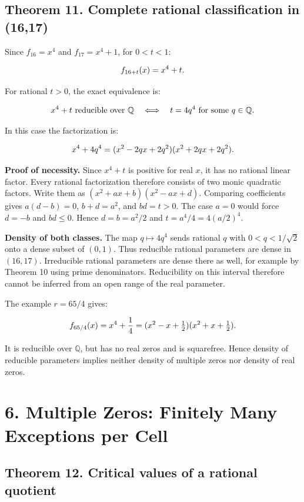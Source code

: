 \documentclass[11pt,a4paper]{article}
\newcommand{\fitmath}[1]{\begingroup\setbox0=\hbox{$\displaystyle #1$}\ifdim\wd0>\linewidth\resizebox{\linewidth}{!}{\box0}\else\box0\fi\endgroup}
\begin{document}
\subsection*{Theorem 11. Complete rational classification in (16,17)}

Since $f_{16}=x^4$ and $f_{17}=x^4+1$, for $0<t<1$:


\[
\fitmath{f_{16+t}(x)=x^4+t.}
\]


For rational $t>0$, the exact equivalence is:


\[
\fitmath{x^4+t\text{ reducible over }\mathbb Q\quad\Longleftrightarrow\quad t=4q^4\text{ for some }q\in\mathbb Q.}
\]


In this case the factorization is:


\[
\fitmath{x^4+4q^4=(x^2-2qx+2q^2)(x^2+2qx+2q^2).}
\]


\textbf{Proof of necessity.} Since $x^4+t$ is positive for real $x$, it has no rational linear factor. Every rational factorization therefore consists of two monic quadratic factors. Write them as $(x^2+ax+b)(x^2-ax+d)$. Comparing coefficients gives $a(d-b)=0$, $b+d=a^2$, and $bd=t>0$. The case $a=0$ would force $d=-b$ and $bd\leq0$. Hence $d=b=a^2/2$ and $t=a^4/4=4(a/2)^4$.


\textbf{Density of both classes.} The map $q\mapsto4q^4$ sends rational $q$ with $0<q<1/\sqrt2$ onto a dense subset of $(0,1)$. Thus reducible rational parameters are dense in $(16,17)$. Irreducible rational parameters are dense there as well, for example by Theorem 10 using prime denominators. Reducibility on this interval therefore cannot be inferred from an open range of the real parameter.


The example $r=65/4$ gives:


\[
\fitmath{f_{65/4}(x)=x^4+\frac14=(x^2-x+\tfrac12)(x^2+x+\tfrac12).}
\]


It is reducible over $\mathbb Q$, but has no real zeros and is squarefree. Hence density of reducible parameters implies neither density of multiple zeros nor density of real zeros.


\section*{6. Multiple Zeros: Finitely Many Exceptions per Cell}

\subsection*{Theorem 12. Critical values of a rational quotient}
\end{document}
